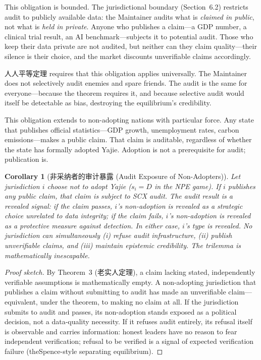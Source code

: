 \documentclass[12pt,a4paper]{ctexart}
\newtheorem{corollary}[theorem]{Corollary}
\theoremstyle{definition}
\theoremstyle{remark}
\begin{document}
This obligation is bounded. The jurisdictional boundary (Section~6.2) restricts audit to publicly available data: the Maintainer audits what is \textit{claimed in public}, not what is \textit{held in private}. Anyone who publishes a claim—a GDP number, a clinical trial result, an AI benchmark—subjects it to potential audit. Those who keep their data private are not audited, but neither can they claim quality—their silence is their choice, and the market discounts unverifiable claims accordingly.

人人平等定理 requires that this obligation applies universally. The Maintainer does not selectively audit enemies and spare friends. The audit is the same for everyone—because the theorem requires it, and because selective audit would itself be detectable as bias, destroying the equilibrium's credibility.

This obligation extends to non-adopting nations with particular force. Any state that publishes official statistics—GDP growth, unemployment rates, carbon emissions—makes a public claim. That claim is auditable, regardless of whether the state has formally adopted Yajie. Adoption is not a prerequisite for audit; publication is.

\begin{corollary}[非采纳者的审计暴露 (Audit Exposure of Non-Adopters)]
\label{cor:non-adopter-exposure}
Let jurisdiction $i$ choose not to adopt Yajie ($s_i = D$ in the NPE game). If $i$ publishes any public claim, that claim is subject to SCX audit. The audit result is a revealed signal: if the claim passes, $i$'s non-adoption is revealed as a strategic choice unrelated to data integrity; if the claim fails, $i$'s non-adoption is revealed as a protective measure against detection. In either case, $i$'s type is revealed. No jurisdiction can simultaneously (i) refuse audit infrastructure, (ii) publish unverifiable claims, and (iii) maintain epistemic credibility. The trilemma is mathematically inescapable.
\end{corollary}

\begin{proof}[Proof sketch]
By Theorem~3 (老实人定理), a claim lacking stated, independently verifiable assumptions is mathematically empty. A non-adopting jurisdiction that publishes a claim without submitting to audit has made an unverifiable claim—equivalent, under the theorem, to making no claim at all. If the jurisdiction submits to audit and passes, its non-adoption stands exposed as a political decision, not a data-quality necessity. If it refuses audit entirely, its refusal itself is observable and carries information: honest leaders have no reason to fear independent verification; refusal to be verified is a signal of expected verification failure (theSpence-style separating equilibrium).
\end{proof}
\end{document}
